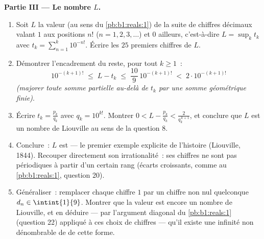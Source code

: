 \begin{problem}
\medskip
\noindent\textbf{Partie III --- Le nombre $L$.}
\begin{enumerate}[resume]
  \item Soit $L$ la valeur (au sens du
        \cref{pb:b1:reals:1}) de la suite de chiffres décimaux valant
        $1$ aux positions $n!$ ($n = 1, 2, 3, \dots$)
        et $0$ ailleurs, c'est-à-dire $L = \sup_k t_k$ avec $t_k =
        \sum_{n=1}^{k} 10^{-n!}$. Écrire les $25$ premiers
        chiffres de $L$.
  \item Démontrer l'encadrement du reste, pour tout $k \geq 1$~:
        \[
        10^{-(k+1)!} \;\leq\; L - t_k \;\leq\;
        \frac{10}{9}\,10^{-(k+1)!} \;<\; 2\cdot 10^{-(k+1)!}
        \]
        \emph{(majorer toute somme partielle au-delà de $t_k$ par une somme
        géométrique finie)}.
  \item Écrire $t_k = \frac{p_k}{q_k}$ avec $q_k = 10^{k!}$.
        Montrer $0 < L - \frac{p_k}{q_k} < \frac{2}{q_k^{\,k+1}}$,
        et conclure que $L$ est un nombre de Liouville au sens
        de la question 8.
  \item Conclure~: $L$ est  --- le premier exemple
        explicite de l'histoire (Liouville, 1844). Recouper directement
        son irrationalité~: ses chiffres ne sont pas périodiques à partir
        d'un certain rang (écarts croissants, comme au \cref{pb:b1:reals:1},
        question 20).
  \item Généraliser~: remplacer chaque chiffre $1$ par un chiffre non nul
        quelconque $d_n \in \intint{1}{9}$. Montrer que la valeur est
        encore un nombre de Liouville, et en déduire --- par l'argument
        diagonal du \cref{pb:b1:reals:1} (question 22) appliqué
        à ces choix de chiffres --- qu'il existe une infinité non
        dénombrable de  de cette forme.
\end{enumerate}


\end{problem}
